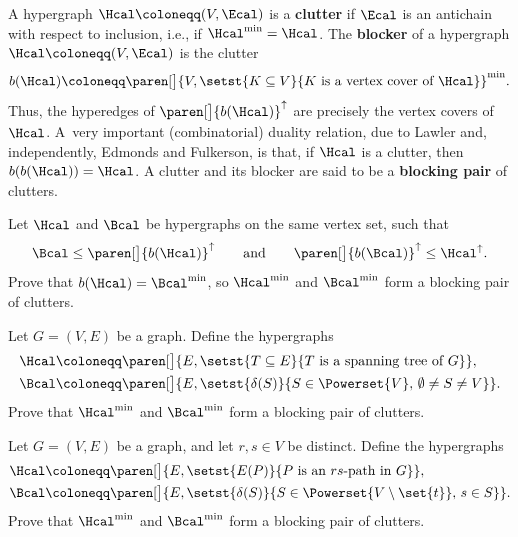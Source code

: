 \documentclass[11pt,leqno,final]{amsart}
\begin{document}
A hypergraph \(\Hcal \coloneqq (V,\Ecal)\) is a \textbf{clutter} if
\(\Ecal\) is an antichain with respect to inclusion, i.e., if
\(\Hcal^{\min} = \Hcal\).
The \textbf{blocker} of a hypergraph \(\Hcal \coloneqq (V,\Ecal)\) is
the clutter
\begin{equation*}
  b(\Hcal)
  \coloneqq
  \paren[\big]{
    V,
    \setst{K \subseteq V}{K \text{ is a vertex cover of~\(\Hcal\)}}
  }^{\min}.
\end{equation*}
Thus, the hyperedges of \(\paren[\big]{b(\Hcal)}^{\uparrow}\) are
precisely the vertex covers of~\(\Hcal\).
A~very important (combinatorial) duality relation, due to Lawler and,
independently, Edmonds and Fulkerson, is that, if \(\Hcal\) is a
clutter, then \(b(b(\Hcal)) = \Hcal\).
A clutter and its blocker are said to be a \textbf{blocking pair} of
clutters.

\begin{exercise}
  Let \(\Hcal\) and \(\Bcal\) be hypergraphs on the same vertex set,
  such that
  \begin{equation*}
    \Bcal \leq \paren[\big]{b(\Hcal)}^{\uparrow}
    \qquad\text{and}\qquad
    \paren[\big]{b(\Bcal)}^{\uparrow} \leq \Hcal^{\uparrow}.
  \end{equation*}
  Prove that \(b(\Hcal) = \Bcal^{\min}\), so \(\Hcal^{\min}\) and
  \(\Bcal^{\min}\) form a blocking pair of clutters.
\end{exercise}

\begin{exercise}
  \label{ex:tree-cut-blocker}
  Let \(G = (V,E)\) be a graph.
  Define the hypergraphs
  \begin{align*}
    \Hcal
    & \coloneqq
    \paren[\big]{
      E,
      \setst{T \subseteq E}{T \text{ is a spanning tree of~\(G\)}}
    },
    \\
    \Bcal
    & \coloneqq
    \paren[\big]{
      E,
      \setst{\delta(S)}{S \in \Powerset{V},\, \emptyset \neq S \neq V}
    }.
  \end{align*}
  Prove that \(\Hcal^{\min}\) and \(\Bcal^{\min}\) form a blocking
  pair of clutters.
\end{exercise}

\begin{exercise}
  \label{ex:rs-path-blocker}
  Let \(G = (V,E)\) be a graph, and let \(r,s \in V\) be distinct.
  Define the hypergraphs
  \begin{align*}
    \Hcal
    & \coloneqq
    \paren[\big]{
      E,
      \setst{E(P)}{P \text{ is an \(rs\)-path in~\(G\)}}
    },
    \\
    \Bcal
    & \coloneqq
    \paren[\big]{
      E,
      \setst{\delta(S)}{S \in \Powerset{V \setminus \set{t}},\, s \in S}
    }.
  \end{align*}
  Prove that \(\Hcal^{\min}\) and \(\Bcal^{\min}\) form a blocking
  pair of clutters.
\end{exercise}
\end{document}
